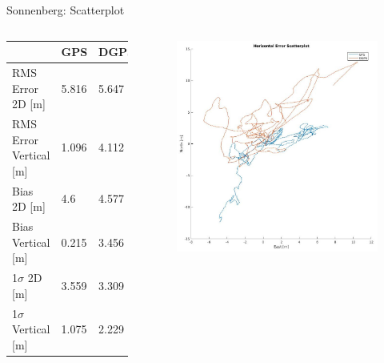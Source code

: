 \documentclass[12pt, compress, xcolor=table]{beamer}
\begin{document}
\begin{frame}{Sonnenberg: Scatterplot}
 \begin{columns}
  
  \begin{table}[]
  \centering
  \scriptsize
  \begin{tabular}{l|ll}
			    & GPS   & DGPS  \\ \hline
  RMS Error 2D {[}m{]}       & 5.816 & 5.647 \\
  RMS Error Vertical {[}m{]} & 1.096 & 4.112 \\
  Bias 2D {[}m{]}            & 4.6   & 4.577 \\
  Bias Vertical {[}m{]}      & 0.215 & 3.456 \\
  1$\sigma$ 2D {[}m{]}       & 3.559 & 3.309 \\
  1$\sigma$ Vertical {[}m{]} & 1.075 & 2.229
  \end{tabular}
  \end{table}
  
  \begin{figure}
   \centering
   \includegraphics[width=\textwidth]{images/Scatterplot_Kriens.jpg}
  \end{figure}
  
 \end{columns}
\end{frame}
\end{document}

